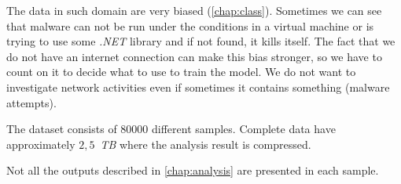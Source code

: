 The data in such domain are very biased (\ref{chap:class}). Sometimes we can see that malware can not be run under the conditions in a virtual machine or is trying to use some \emph{.NET} library and if not found, it kills itself. The fact that we do not have an internet connection can make this bias stronger, so we have to count on it to decide what to use to train the model. We do not want to investigate network activities even if sometimes it contains something (malware attempts).

The dataset consists of $80000$ different samples. Complete data have approximately $2,5$~\emph{TB} where the analysis result is compressed.

Not all the outputs described in \ref{chap:analysis} are presented in each sample.












% 




